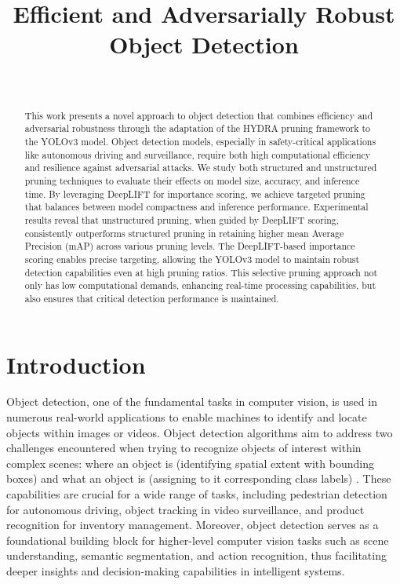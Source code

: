 \documentclass[journal,onecolumn,12pt]{IEEEtran}
\begin{document}
\title{Efficient and Adversarially Robust Object Detection}
\author{
 \\
}

\maketitle

\begin{abstract}
This work presents a novel approach to object detection that combines efficiency and adversarial robustness through the adaptation of the HYDRA pruning framework to the YOLOv3 model. Object detection models, especially in safety-critical applications like autonomous driving and surveillance, require both high computational efficiency and resilience against adversarial attacks. We study both structured and unstructured pruning techniques to evaluate their effects on model size, accuracy, and inference time. By leveraging DeepLIFT for importance scoring, we achieve targeted pruning that balances between model compactness and inference performance. Experimental results reveal that unstructured pruning, when guided by DeepLIFT scoring, consistently outperforms structured pruning in retaining higher mean Average Precision (mAP) across various pruning levels. The DeepLIFT-based importance scoring enables precise targeting, allowing the YOLOv3 model to maintain robust detection capabilities even at high pruning ratios. This selective pruning approach not only has low computational demands, enhancing real-time processing capabilities, but also ensures that critical detection performance is maintained.
\end{abstract}


\section{Introduction}

Object detection, one of the fundamental tasks in computer vision, is used in numerous real-world applications to enable machines to identify and locate objects within images or videos. Object detection algorithms aim to address two challenges encountered when trying to recognize objects of interest within complex scenes: where an object is (identifying spatial extent with bounding boxes) and what an object is (assigning to it corresponding class labels) \cite{zhao2019objectdetectiondeeplearning}. These capabilities are crucial for a wide range of tasks, including pedestrian detection for autonomous driving, object tracking in video surveillance, and product recognition for inventory management. Moreover, object detection serves as a foundational building block for higher-level computer vision tasks such as scene understanding, semantic segmentation, and action recognition, thus facilitating deeper insights and decision-making capabilities in intelligent systems.
\end{document}
